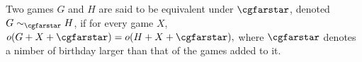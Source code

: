\documentclass[oneside,reqno]{amsart}
\newcommand{\cgfarstareq}[2]{{#1}\sim_{\cgfarstar}{#2}}
\begin{document}


    


    \begin{definition}
        Two games $G$ and $H$ are said to be equivalent under $\cgfarstar$, denoted $\cgfarstareq{G}{H}$, if for every game $X$, ~$o(G + X + \cgfarstar) = o(H + X + \cgfarstar),$ where $\cgfarstar$ denotes a nimber of birthday larger than that of the games added to it.
    \end{definition}
\end{document}
